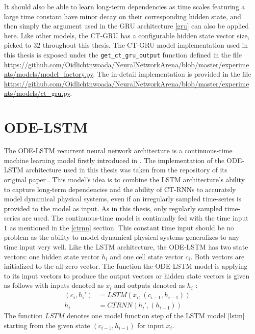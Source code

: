 \documentclass[draft,final]{vutinfth} %
\begin{document}
    It should also be able to learn long-term dependencies as time scales featuring a large time constant have minor decay on their corresponding hidden state, and then simply the argument used in the GRU architecture \ref{gru} can also be applied here.
    Like other models, the CT-GRU has a configurable hidden state vector size, picked to $32$ throughout this thesis.
    The CT-GRU model implementation used in this thesis is exposed under the \texttt{get\_ct\_gru\_output} function defined in the file \url{https://github.com/Oidlichtnwoada/NeuralNetworkArena/blob/master/experiments/models/model_factory.py}.
    The in-detail implementation is provided in the file \url{https://github.com/Oidlichtnwoada/NeuralNetworkArena/blob/master/experiments/models/ct_gru.py}.


    \section{ODE-LSTM} \label{odelstm}
    The ODE-LSTM recurrent neural network architecture is a continuous-time machine learning model firstly introduced in \cite{ODELSTM}.
    The implementation of the ODE-LSTM architecture used in this thesis was taken from the repository of its original paper \cite{ODELSTM}.
    This model's idea is to combine the LSTM architecture's ability to capture long-term dependencies and the ability of CT-RNNs to accurately model dynamical physical systems, even if an irregularly sampled time-series is provided to the model as input.
    As in this thesis, only regularly sampled time-series are used. The continuous-time model is continually fed with the time input $1$ as mentioned in the \ref{ctrnn} section.
    This constant time input should be no problem as the ability to model dynamical physical systems generalizes to any time input very well.
    Like the LSTM architecture, the ODE-LSTM has two state vectors: one hidden state vector $h_i$ and one cell state vector $c_i$. Both vectors are initialized to the all-zero vector.
    The function the ODE-LSTM model is applying to its input vectors to produce the output vectors or hidden state vectors is given as follows with inputs denoted as $x_i$ and outputs denoted as $h_i$ \cite[p. 5]{ODELSTM}:
    \begin{align}
    (c_i,h_i')
        &= LSTM(x_i, (c_{i-1}, h_{i-1})) \\
        h_i &= CTRNN(h_i', (h_{i-1}))
    \end{align}
    The function $LSTM$ denotes one model function step of the LSTM model \ref{lstm} starting from the given state $(c_{i-1}, h_{i-1})$ for input $x_i$.
\end{document}
